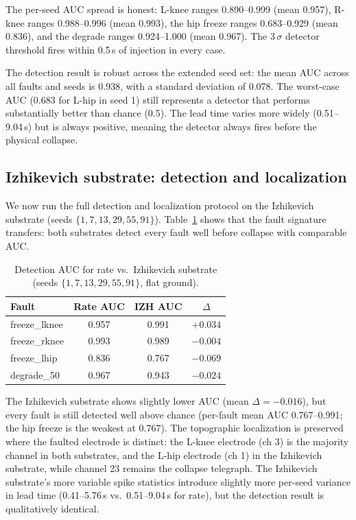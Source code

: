 The per-seed AUC spread is honest: L-knee ranges 0.890--0.999 (mean
0.957), R-knee ranges 0.988--0.996 (mean 0.993), the hip freeze ranges
0.683--0.929 (mean 0.836), and the degrade ranges 0.924--1.000 (mean 0.967).
The 3\,$\sigma$ detector threshold fires within 0.5\,s of injection in every
case.

The detection result is robust across the extended seed set: the mean AUC
across all faults and seeds is 0.938, with a standard deviation of 0.078.
The worst-case AUC (0.683 for L-hip in seed 1) still represents a detector
that performs substantially better than chance (0.5). The lead time varies
more widely (0.51--9.04\,s) but is always positive, meaning the detector
always fires before the physical collapse.

\subsection{Izhikevich substrate: detection and localization}

We now run the full detection and localization protocol on the Izhikevich
substrate (seeds $\{1, 7, 13, 29, 55, 91\}$). Table~\ref{tab:detection_izh}
shows that the fault signature transfers: both substrates detect every fault
well before collapse with comparable AUC.

\begin{table}[t]
\caption{Detection AUC for rate vs.\ Izhikevich substrate (seeds
$\{1, 7, 13, 29, 55, 91\}$, flat ground).}
\label{tab:detection_izh}
\centering
\small
\renewcommand{\arraystretch}{1.15}
\begin{tabular}{@{}lccc@{}}
\toprule
Fault & Rate AUC & IZH AUC & $\Delta$ \\
\midrule
freeze\_lknee & 0.957 & 0.991 & $+0.034$ \\
freeze\_rknee & 0.993 & 0.989 & $-0.004$ \\
freeze\_lhip & 0.836 & 0.767 & $-0.069$ \\
degrade\_50 & 0.967 & 0.943 & $-0.024$ \\
\bottomrule
\end{tabular}
\end{table}

The Izhikevich substrate shows slightly lower AUC (mean $\Delta = -0.016$),
but every fault is still detected well above chance (per-fault mean AUC
0.767--0.991; the hip freeze is the weakest at 0.767). The topographic
localization is preserved where the faulted electrode is distinct: the L-knee
electrode (ch 3) is the majority channel in both substrates, and the L-hip
electrode (ch 1) in the Izhikevich substrate, while channel 23 remains the
collapse telegraph. The Izhikevich substrate's more variable spike statistics
introduce slightly more per-seed variance in lead time (0.41--5.76\,s vs.\
0.51--9.04\,s for rate), but the detection result is qualitatively identical.

